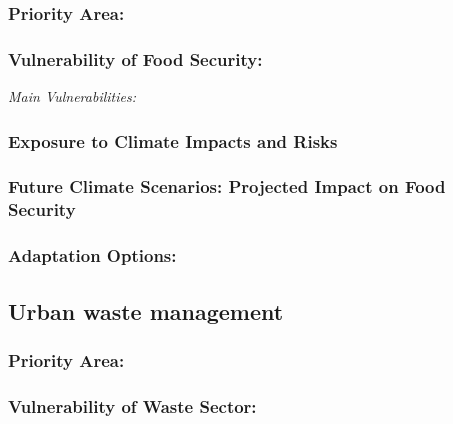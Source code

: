 \documentclass[
]{book}
\begin{document}
\hypertarget{priority-area}{%
\subsubsection{Priority Area:}\label{priority-area}}

\hypertarget{vulnerability-of-food-security}{%
\subsubsection{Vulnerability of Food Security:}\label{vulnerability-of-food-security}}

\emph{Main Vulnerabilities:}

\hypertarget{exposure-to-climate-impacts-and-risks-8}{%
\subsubsection{Exposure to Climate Impacts and Risks}\label{exposure-to-climate-impacts-and-risks-8}}

\hypertarget{future-climate-scenarios-projected-impact-on-food-security}{%
\subsubsection{Future Climate Scenarios: Projected Impact on Food Security}\label{future-climate-scenarios-projected-impact-on-food-security}}

\hypertarget{adaptation-options-8}{%
\subsubsection{Adaptation Options:}\label{adaptation-options-8}}

\hypertarget{urban-waste-management}{%
\subsection{Urban waste management}\label{urban-waste-management}}

\hypertarget{priority-area-1}{%
\subsubsection{Priority Area:}\label{priority-area-1}}

\hypertarget{vulnerability-of-waste-sector}{%
\subsubsection{Vulnerability of Waste Sector:}\label{vulnerability-of-waste-sector}}
\end{document}
